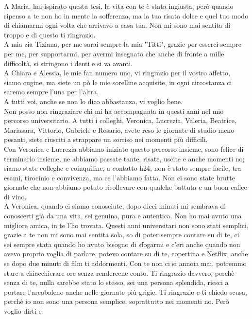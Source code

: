 A Maria, hai ispirato questa tesi, la vita con te è stata ingiusta, però quando ripenso a te non ho in mente
la sofferenza, ma la tua risata dolce e quel tuo modo di chiamarmi ogni volta che arrivavo a casa tua. Non mi sono mai 
sentita di troppo e di questo ti ringrazio.\\
A mia zia Tiziana, per me sarai sempre la mia "Titti", grazie per esserci sempre per me, per supportarmi, per avermi
insegnato che anche di fronte a mille difficoltà, si stringono i denti e si va avanti.\\
A Chiara e Alessia, le mie fan numero uno, vi ringrazio per il vostro affetto, siamo cugine, ma siete un pò le mie 
sorelline acquisite, in ogni circostanza ci saremo sempre l’una per l’altra.\\
A tutti voi, anche se non lo dico abbastanza, vi voglio bene.\\
Non posso non ringraziare chi mi ha accompagnata in questi anni nel mio percorso universitario. A tutti i colleghi, 
Veronica, Lucrezia, Valeria, Beatrice, Mariasara, Vittorio, Gabriele e Rosario, avete reso le giornate di studio meno 
pesanti, siete riusciti a strappare un sorriso nei momenti più difficili.\\
Con Veronica e Lucrezia abbiamo iniziato questo percorso insieme, sono felice di terminarlo insieme, ne abbiamo passate 
tante, risate, uscite e anche momenti no; siamo state colleghe e coinquiline, a contatto h24, non è stato sempre facile, 
tra esami, tirocinio e convivenza, ma ce l’abbiamo fatta. Non ci sono state brutte giornate che non abbiamo 
potuto risollevare con qualche battuta e un buon calice di vino.\\
A Veronica, quando ci siamo conosciute, dopo dieci minuti mi sembrava di conoscerti già da 
una vita, sei genuina, pura e autentica. Non ho mai avuto una migliore amica, in te l’ho trovata. Questi anni universitari 
non sono stati semplici, grazie a te non mi sono mai sentita sola, so di poter sempre contare su di te, ci sei sempre 
stata quando ho avuto bisogno di sfogarmi e c’eri anche quando non avevo proprio voglia di parlare, potevo contare su 
di te, copertina e Netflix, anche se dopo due minuti di film ti addormenti. Con te non ci si annoia mai, potremmo stare 
a chiacchierare ore senza rendercene conto. Ti ringrazio davvero, perchè senza di te, nulla sarebbe stato lo stesso, 
sei una persona splendida, riesci a portare l’arcobaleno anche nelle giornate più grigie. 
Ti ringrazio e ti chiedo scusa, perchè io non sono una persona semplice, soprattutto nei momenti no. Però voglio dirti e 
